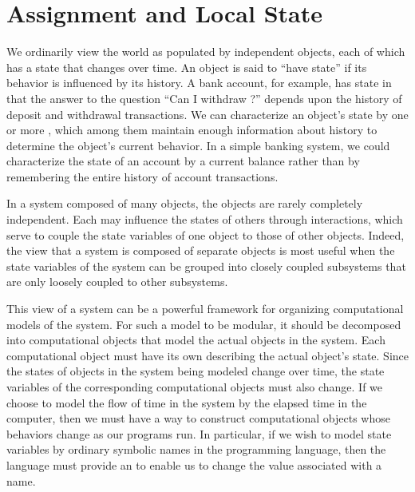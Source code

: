 \section{Assignment and Local State}
\label{Section 3.1}

We ordinarily view the world as populated by independent objects, each of which has a state that changes over time.
An object is said to “have state” if its behavior is influenced by its history.
A bank account, for example, has state in that the answer to the question “Can I withdraw ?” depends upon the history of deposit and withdrawal transactions.
We can characterize an object’s state by one or more , which among them maintain enough information about history to determine the object’s current behavior.
In a simple banking system, we could characterize the state of an account by a current balance rather than by remembering the entire history of account transactions.

In a system composed of many objects, the objects are rarely completely independent.
Each may influence the states of others through interactions, which serve to couple the state variables of one object to those of other objects.
Indeed, the view that a system is composed of separate objects is most useful when the state variables of the system can be grouped into closely coupled subsystems that are only loosely coupled to other subsystems.

This view of a system can be a powerful framework for organizing computational models of the system.
For such a model to be modular, it should be decomposed into computational objects that model the actual objects in the system.
Each computational object must have its own  describing the actual object’s state.
Since the states of objects in the system being modeled change over time, the state variables of the corresponding computational objects must also change.
If we choose to model the flow of time in the system by the elapsed time in the computer, then we must have a way to construct computational objects whose behaviors change as our programs run.
In particular, if we wish to model state variables by ordinary symbolic names in the programming language, then the language must provide an  to enable us to change the value associated with a name.




